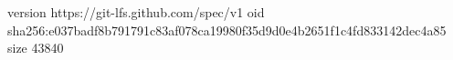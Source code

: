 version https://git-lfs.github.com/spec/v1
oid sha256:e037badf8b791791c83af078ca19980f35d9d0e4b2651f1c4fd833142dec4a85
size 43840
